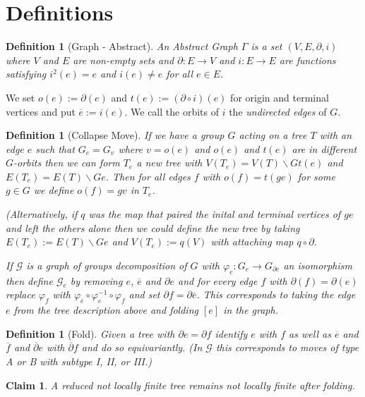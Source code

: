 \documentclass{article}
\theoremstyle{mystyle}
\newtheorem{defn}[lem]{Definition}
\newtheorem*{claim*}{Claim}
\theoremstyle{remark}
\begin{document}
\section{Definitions}
\begin{defn}[Graph - Abstract]
	An {\em Abstract Graph} \(\Gamma\) is a set \((V,E, \partial, i)\) where \(V\) and \(E\) are non-empty sets and \(\partial: E \to V\) and \(i: E \to E\) are functions satisfying \(i^2(e)=e\) and \(i(e) \neq e\) for all \(e \in E\). 
\end{defn}

We set \(o(e) := \partial(e)\) and \(t(e) := (\partial\circ i)(e)\) for origin and terminal vertices and put \(\overline{e} := i(e)\). We call the orbits of \(i\) the {\em undirected edges} of \(G\).

\begin{defn}[Collapse Move]
	If we have a group \(G\) acting on a tree \(T\) with an edge \(e\) such that \(G_{e} = G_{v}\) where \(v=o(e)\) and \(o(e)\) and \(t(e)\) are in different \(G\)-orbits then we can form \(T_{e}\) a new tree with \(V(T_{e} )=V(T)\smallsetminus G t(e)\) and \(E(T_{e} )=E(T) \smallsetminus Ge\). Then for all edges \(f\) with \(o(f) = t(ge)\) for some \(g \in G\) we define \(o(f)=gv\) in \(T_{e}\). 
	
	(Alternatively, if \(q\) was the map that paired the inital and terminal vertices of \(g e\) and left the others alone then we could define the new tree by taking \(E(T_{e} ):=E(T)\smallsetminus Ge \) and \(V(T_{e} ):=q(V)\) with attaching map \(q \circ \partial\).

	If \(\mathcal{G}\) is a graph of groups decomposition of \(G\) with \(\varphi_{e}: G_{e} \to G_{\partial e}\) an isomorphism then define \(\mathcal{G}_{e}\) by removing \(e\), \(\overline{e}\) and \(\partial e\) and for every edge \(f\) with \(\partial(f) = \partial(e)\) replace \(\varphi_{f}\) with \(\varphi_{\overline{e}} \circ \varphi_{e}^{-1} \circ \varphi_{f}\) and set \(\partial f = \partial \overline{e}\). This corresponds to taking the edge \(e\) from the tree description above and folding \([e]\) in the graph.

\end{defn}
\begin{defn}[Fold]
	Given a tree with \(\partial e = \partial f\) identify \(e\) with \(f\) as well as \(\overline{e}\) and \(\overline{f}\) and \(\overline{\partial} e\) with \(\overline{\partial} f\) and do so equivariantly. (In \(\mathcal{G}\) this corresponds to moves of type A or B with subtype I, II, or III.)
\end{defn}

\begin{claim*} A reduced not locally finite tree remains not locally finite after folding.
\end{claim*}
\end{document}
